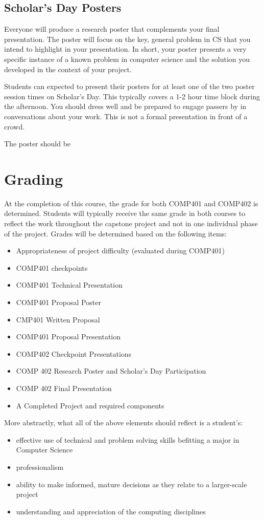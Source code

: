 \documentclass[10pt]{article}
\begin{document}
\subsection{Scholar's Day Posters}

Everyone will produce a research poster that complements your final presentation. The poster will focus on the key, general problem in CS that you intend to highlight in your presentation.  In short, your poster presents a very specific instance of a known problem in computer science and the solution you developed in the context of your project. 

Students can expected to present their posters for at least one of the two poster session times on Scholar's Day.  This typically covers a 1-2 hour time block during the afternoon.  You should dress well and be prepared to engage passers by in conversations about your work.  This is not a formal presentation in front of a crowd.    

The poster should be 


\section{Grading}

At the completion of this course, the grade for both COMP401 and COMP402 is determined. Students will typically receive the same grade in both courses to reflect the work throughout the capstone project and not in one individual phase of the project. Grades will be determined based on the following items:
\begin{itemize}
\item Appropriateness of project difficulty (evaluated during COMP401) 
\item COMP401 checkpoints
\item COMP401 Technical Presentation
\item COMP401 Proposal Poster
\item CMP401 Written Proposal
\item COMP401 Proposal Presentation
\item COMP402 Checkpoint Presentations 
\item COMP 402 Research Poster and Scholar's Day Participation 
\item COMP 402 Final Presentation 
\item A Completed Project and required components
\end{itemize}

More abstractly, what all of the above elements should reflect is a student's: 
\begin{itemize}
\item effective use of technical and problem solving skills befitting a major in Computer Science
\item professionalism
\item ability to make informed, mature decisions as they relate to a larger-scale project
\item understanding and appreciation of the computing disciplines
\end{itemize}
\end{document}
